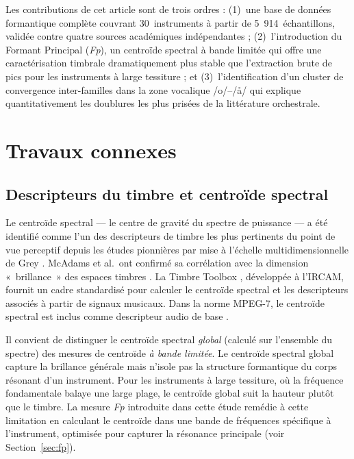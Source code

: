 \documentclass[12pt,a4paper]{article}
\begin{document}
Les contributions de cet article sont de trois ordres : (1)~une base de données
formantique complète couvrant 30~instruments à partir de 5~914~échantillons, validée
contre quatre sources académiques indépendantes ; (2)~l'introduction du Formant
Principal (\textit{Fp}), un centroïde spectral à bande limitée qui offre une
caractérisation timbrale dramatiquement plus stable que l'extraction brute de pics
pour les instruments à large tessiture ; et (3)~l'identification d'un cluster de
convergence inter-familles dans la zone vocalique /o/--/\aa/ qui explique
quantitativement les doublures les plus prisées de la littérature orchestrale.

\section{Travaux connexes}

\subsection{Descripteurs du timbre et centroïde spectral}

Le centroïde spectral --- le centre de gravité du spectre de puissance --- a été
identifié comme l'un des descripteurs de timbre les plus pertinents du point de vue
perceptif depuis les études pionnières par mise à l'échelle multidimensionnelle de
Grey \citep{Grey1977}. McAdams et al.\ ont confirmé sa corrélation avec la dimension
«~brillance~» des espaces timbres \citep{McAdams1995}. La Timbre Toolbox
\citep{Peeters2011}, développée à l'IRCAM, fournit un cadre standardisé pour calculer
le centroïde spectral et les descripteurs associés à partir de signaux musicaux. Dans
la norme MPEG-7, le centroïde spectral est inclus comme descripteur audio de base
\citep{MPEG7}.

Il convient de distinguer le centroïde spectral \emph{global} (calculé sur l'ensemble
du spectre) des mesures de centroïde \emph{à bande limitée}. Le centroïde spectral
global capture la brillance générale mais n'isole pas la structure formantique du corps
résonant d'un instrument. Pour les instruments à large tessiture, où la fréquence
fondamentale balaye une large plage, le centroïde global suit la hauteur plutôt que le
timbre. La mesure \textit{Fp} introduite dans cette étude remédie à cette limitation en
calculant le centroïde dans une bande de fréquences spécifique à l'instrument, optimisée
pour capturer la résonance principale (voir Section~\ref{sec:fp}).
\end{document}

